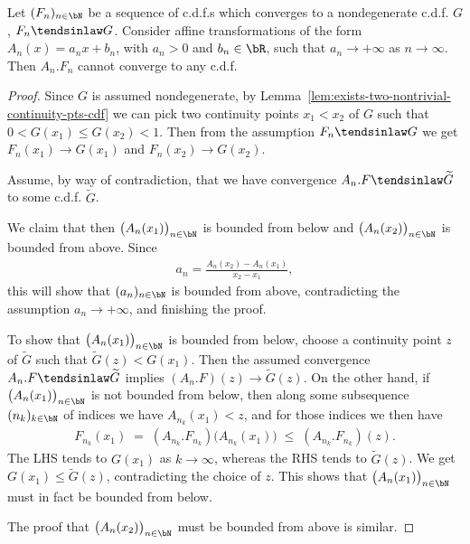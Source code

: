 \begin{lemma}
  \label{lem:impossible-expanding-limit}
  \leanok
  Let $(F_n)_{n \in \bN}$ be a sequence of c.d.f.s which converges to a nondegenerate
  c.d.f. $G$, $F_n \tendsinlaw G$. Consider affine transformations of the form $A_n(x) = a_n x + b_n$,
  with $a_n > 0$ and $b_n \in \bR$, such that $a_n \to +\infty$
  as $n \to \infty$. Then $A_n . F_n$ cannot converge to any c.d.f.
\end{lemma}
\begin{proof}
  Since $G$ is assumed nondegenerate, by Lemma~\ref{lem:exists-two-nontrivial-continuity-pts-cdf}
  we can pick two continuity points $x_1 < x_2$
  of $G$ such that $0 < G(x_1) \le G(x_2) < 1$. Then from the assumption
  $F_n \tendsinlaw G$ we get $F_n(x_1) \to G(x_1)$ and $F_n(x_2) \to G(x_2)$.

  Assume, by way of contradiction, that we have convergence
  $A_n . F \tendsinlaw \widetilde{G}$ to some c.d.f. $\widetilde{G}$.

  We claim that then $\big(A_n(x_1)\big)_{n \in \bN}$ is bounded from below and
  $\big(A_n(x_2)\big)_{n \in \bN}$ is bounded from above.
  Since
  \begin{align*}
    a_n = \frac{A_n(x_2) - A_n(x_1)}{x_2 - x_1} ,
  \end{align*}
  this will show that $(a_n)_{n \in \bN}$ is bounded from above, contradicting
  the assumption $a_n \to +\infty$, and finishing the proof.

  To show that $\big(A_n(x_1)\big)_{n \in \bN}$ is bounded from below,
  choose a continuity point $z$ of $\widetilde{G}$ such that
  $\widetilde{G}(z) < G(x_1)$. Then the assumed convergence
  $A_n . F \tendsinlaw \widetilde{G}$ implies
  $(A_n . F)(z) \to \widetilde{G}(z)$.
  On the other hand, if $\big(A_n(x_1)\big)_{n \in \bN}$ is not
  bounded from below, then along some subsequence $(n_k)_{k \in \bN}$ of indices
  we have $A_{n_k}(x_1) < z$, and for those indices we then have
  \begin{align*}
    F_{n_k}(x_1) \; = \; (A_{n_k} . F_{n_k}) \big( A_{n_k}(x_1) \big)
      \; \le \; (A_{n_k} . F_{n_k})(z) .
  \end{align*}
  The LHS tends to $G(x_1)$ as $k \to \infty$, whereas the RHS tends
  to $\widetilde{G}(z)$. We get $G(x_1) \le \widetilde{G}(z)$, contradicting
  the choice of $z$. This shows that $\big(A_n(x_1)\big)_{n \in \bN}$ must
  in fact be bounded from below.

  The proof that $\big(A_n(x_2)\big)_{n \in \bN}$ must be bounded from above
  is similar.
\end{proof}

